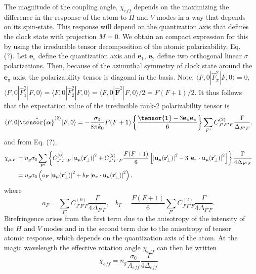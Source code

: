 \documentclass[preprint,aps,pra,onecolumn]{revtex4-1} %
\begin{document}
The magnitude of the coupling angle, $\chi_{eff}$ depends on the maximizing the difference in the response of the atom to $H$ and $V$ modes in a way that depends on its spin-state.  This response will depend on the quantization axis that defines the clock state with projection $M=0$.  We obtain an compact expression for this by using the irreducible tensor decomposition of the atomic polarizability, Eq. (?).  Let $\mathbf{e}_\pi$ define the quantization axis and $\mathbf{e}_{1}$, $\mathbf{e}_{2}$ define two orthogonal linear $\sigma$ polarizations.  Then, because of the azimuthal symmetry of clock state around the $\mathbf{e}_\pi$ axis, the polarizability tensor is diagonal in the basis.  Note, $\langle F,0 | \hat{F}_{\pi}^2| F,0 \rangle =0$, $\langle F,0 | \hat{F}_{1}^2| F,0 \rangle = \langle F,0 | \hat{F}_{2}^2| F,0 \rangle = \langle F,0 | \hat{\mathbf{F}}^2| F,0 \rangle /2 =F(F+1)/2$.  It thus follows that the expectation value of the  irreducible rank-2 polarizability tensor is
\begin{equation}
\langle F,0 | \hat{\tensor{\boldsymbol{\alpha}}}^{(2)}| F,0 \rangle  = -\frac{\sigma_0}{8\pi k_0} F(F+1) \left\{ \frac{\tensor{\boldsymbol{1}} - 3 \mathbf{e}_\pi \mathbf{e}_\pi }{6} \right\} \sum_{F'} C^{(2)}_{J'F'F} \frac{\Gamma}{ \Delta_{F'F}},
\end{equation}
and from Eq. (?),
\begin{align}
\chi_{\mu,F} &= n_g \sigma_0 \sum_{F'}  \left\{C^{(0)}_{J'F'F}\left|\mathbf{u}_\mu(\mathbf{r}'_\perp)\right|^2+ C^{(2)}_{J'F'F} \frac{F(F+1)}{6}\left[\left|\mathbf{u}_\mu(\mathbf{r}'_\perp)\right|^2- 3 \left|\mathbf{e}_\pi \cdot \mathbf{u}_\mu(\mathbf{r}'_\perp)\right|^2 \right]\right\}   \frac{\Gamma}{4 \Delta_{F'F}} \nonumber \\
&  = n_g \sigma_0\left(  a_{F} \left|\mathbf{u}_\mu(\mathbf{r}'_\perp)\right|^2 + b_{F} \left|\mathbf{e}_\pi \cdot \mathbf{u}_\mu(\mathbf{r}'_\perp)\right|^2 \right),
\end{align}
where
\begin{equation}
a_F = \sum_{F'}  C^{(0)}_{J'F'F} \frac{\Gamma}{4 \Delta_{F'F}},\; \;\; b_F = \frac{F(F+1)}{6}\sum_{F'} C^{(2)}_{J'F'F}  \frac{\Gamma}{4 \Delta_{F'F}}.
\end{equation}
Birefringence arises from the first term due to the anisotropy of the intensity of the $H$ and $V$ modes and in the second term due to the anisotropy of tensor atomic response, which depends on the quantization axis of the atom.  At the magic wavelength the effective rotation angle $\chi_{eff}$ can then be written
\begin{equation}
\chi_{eff} = n_g\frac{\sigma_0}{A_{eff}} \frac{\Gamma}{4\Delta_{eff}}
\end{equation}
\end{document}
